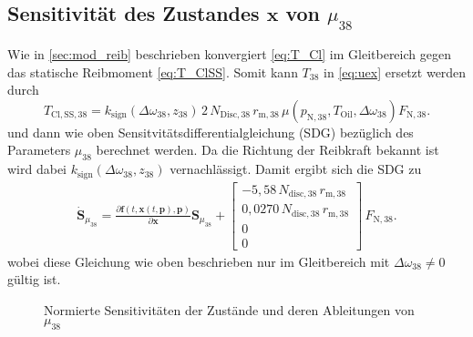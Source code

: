 \subsection{Sensitivität des Zustandes $\pmb{x}$ von $\mu_{38}$}
Wie in \ref{sec:mod_reib} beschrieben konvergiert \eqref{eq:T_Cl} im Gleitbereich gegen das statische Reibmoment \eqref{eq:T_ClSS}. Somit kann $T_{38}$ in \eqref{eq:uex} ersetzt werden durch
\begin{equation}
T_\mathrm{Cl,SS,38} = k_\mathrm{sign}(\Delta \omega_{38},z_{38})\,2\,N_{\mathrm{Disc,38}}\,r_{\mathrm{m},38}\,\mu(p_\mathrm{N,38},T_\mathrm{Oil},\Delta \omega_{38})F_\mathrm{N,38}.
\end{equation}
und dann wie oben Sensitvitätsdifferentialgleichung (SDG) bezüglich des Parameters $\mu_{38}$ berechnet werden. Da die Richtung der Reibkraft bekannt ist wird dabei $k_\mathrm{sign}(\Delta \omega_{38},z_{38})$ vernachlässigt. Damit ergibt sich die SDG zu
\begin{align}
\dot{\pmb{S}}_{\mu_{38}} = \frac{\partial\pmb{f}(t,\pmb{x}(t,\pmb{p}),\pmb{p})}{\partial \pmb{x}} \pmb{S}_{\mu_{38}}
+ \begin{bmatrix} -5,58\,N_\mathrm{disc,38}\,r_{\mathrm{m},38} \\ 0,0270\,N_\mathrm{disc,38}\,r_{\mathrm{m},38} \\ 0 \\ 0 \end{bmatrix}\,F_\mathrm{N,38}.
\end{align}
wobei diese Gleichung wie oben beschrieben nur im Gleitbereich mit $\Delta \omega_{38}\neq 0$ gültig ist.

\begin{figure}
\centering
\newlength\muheight 
\setlength\muheight{8cm}
\newlength\muwidth 
\setlength\muwidth{13cm}

\caption{Normierte Sensitivitäten der Zustände und deren Ableitungen von $\mu_{38}$}
\label{fig:Sens_mu}
\end{figure}

